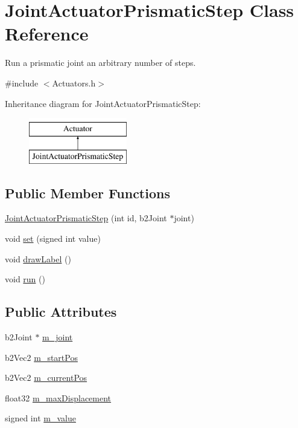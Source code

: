 \hypertarget{classJointActuatorPrismaticStep}{\section{Joint\-Actuator\-Prismatic\-Step Class Reference}
\label{classJointActuatorPrismaticStep}
}


Run a prismatic joint an arbitrary number of steps.  




{\ttfamily \#include $<$Actuators.\-h$>$}

Inheritance diagram for Joint\-Actuator\-Prismatic\-Step\-:\begin{figure}[H]
\begin{center}
\leavevmode
\includegraphics[height=2.000000cm]{classJointActuatorPrismaticStep}
\end{center}
\end{figure}
\subsection*{Public Member Functions}
\begin{DoxyCompactItemize}
\item 
\hyperlink{classJointActuatorPrismaticStep_a15f20c8424d7bc4e226ea428a3d316fa}{Joint\-Actuator\-Prismatic\-Step} (int id, b2\-Joint $\ast$joint)
\item 
void \hyperlink{classJointActuatorPrismaticStep_ace7839e236e16848375f963697ac408a}{set} (signed int value)
\item 
void \hyperlink{classJointActuatorPrismaticStep_aecbb187fd46eb1e197a34bcd54aaf4d4}{draw\-Label} ()
\item 
void \hyperlink{classJointActuatorPrismaticStep_a30a61d48a3719b5d0390be85b7445883}{run} ()
\end{DoxyCompactItemize}
\subsection*{Public Attributes}
\begin{DoxyCompactItemize}
\item 
b2\-Joint $\ast$ \hyperlink{classJointActuatorPrismaticStep_a0b0796c249dd6cecd0c0616a80885ab9}{m\-\_\-joint}
\item 
b2\-Vec2 \hyperlink{classJointActuatorPrismaticStep_a48a004131133ef920d4bed5912519ffc}{m\-\_\-start\-Pos}
\item 
b2\-Vec2 \hyperlink{classJointActuatorPrismaticStep_a13ea9ddc095eaf6e30d0dee871025b29}{m\-\_\-current\-Pos}
\item 
float32 \hyperlink{classJointActuatorPrismaticStep_aa3c0a7f6384201a79b14b681d0b9f274}{m\-\_\-max\-Displacement}
\item 
signed int \hyperlink{classJointActuatorPrismaticStep_a92c61c564dbfc17830ec4109be54f008}{m\-\_\-value}
\end{DoxyCompactItemize}


